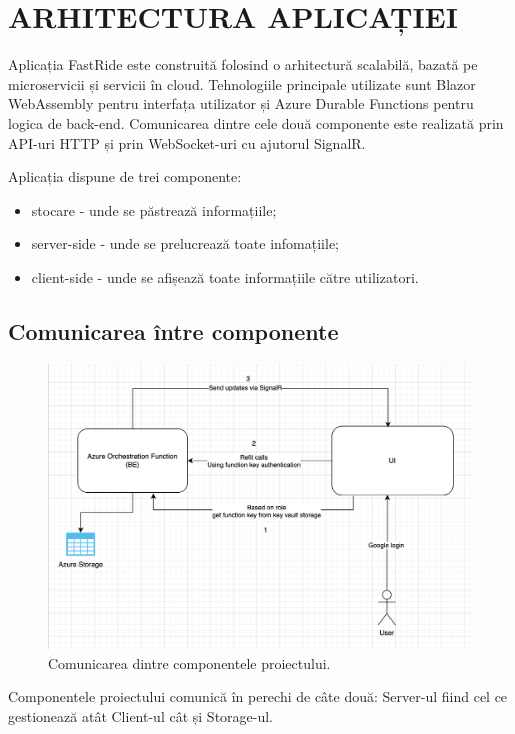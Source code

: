 \chapter{ARHITECTURA APLICAȚIEI}
Aplicația FastRide este construită folosind o arhitectură scalabilă, bazată pe microservicii și servicii în cloud. 
Tehnologiile principale utilizate sunt Blazor WebAssembly pentru interfața utilizator și Azure Durable Functions 
pentru logica de back-end. Comunicarea dintre cele două componente este realizată prin API-uri HTTP și prin 
WebSocket-uri cu ajutorul SignalR.

Aplicația dispune de trei componente:
\begin{itemize}
    \item stocare - unde se păstrează informațiile;
    \item server-side - unde se prelucrează toate infomațiile;
    \item client-side - unde se afișează toate informațiile către utilizatori.
\end{itemize}

\section{Comunicarea între componente}

\begin{figure}[H]
    \centering
    \includegraphics[width=16cm]{Assets/componentsComunication.png}
    \caption{Comunicarea dintre componentele proiectului.}
    \label{fig:componentsComunication}
\end{figure}

Componentele proiectului comunică în perechi de câte două: Server-ul fiind
cel ce gestionează atât Client-ul cât și Storage-ul.

